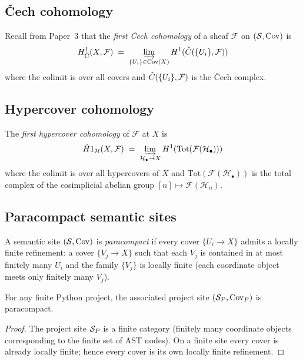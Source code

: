 \documentclass[11pt]{article}
\newcommand{\HC}{\mathcal{H}}              %
\newcommand{\HCech}{\hat{H}}              %
\begin{document}
\subsection{Čech cohomology}

Recall from Paper~3 that the \emph{first Čech cohomology} of a sheaf
$\mathcal{F}$ on $(\mathcal{S}, \mathrm{Cov})$ is
\[
  H^{1}_{\mathrm{\check{C}}}(X, \mathcal{F})
  \;=\;
  \varinjlim_{\{U_i\} \in \mathrm{Cov}(X)}
  H^{1}(\check{C}(\{U_i\}, \mathcal{F}))
\]
where the colimit is over all covers and $\check{C}(\{U_i\}, \mathcal{F})$
is the Čech complex.

\subsection{Hypercover cohomology}

\begin{definition}\label{def:hc-coh}
  The \emph{first hypercover cohomology} of $\mathcal{F}$ at $X$ is
  \[
    \HCech{1}_{\HC}(X, \mathcal{F})
    \;=\;
    \varinjlim_{\HC_\bullet \to X}
    H^1\!\left(\mathrm{Tot}(\mathcal{F}(\HC_\bullet))\right)
  \]
  where the colimit is over all hypercovers of $X$ and
  $\mathrm{Tot}(\mathcal{F}(\HC_\bullet))$ is the total complex of the
  cosimplicial abelian group $[n] \mapsto \mathcal{F}(\HC_n)$.
\end{definition}

\subsection{Paracompact semantic sites}

\begin{definition}\label{def:paracompact}
  A \JuGeo{} semantic site $(\mathcal{S}, \mathrm{Cov})$ is \emph{paracompact} if
  every cover $\{U_i \to X\}$ admits a locally finite refinement:
  a cover $\{V_j \to X\}$ such that each $V_j$ is contained in at
  most finitely many $U_i$ and the family $\{V_j\}$ is locally finite
  (each coordinate object meets only finitely many $V_j$).
\end{definition}

\begin{lemma}\label{lem:paracompact}
  For any finite Python project, the associated project site
  $(\mathcal{S}_P, \mathrm{Cov}_P)$ is paracompact.
\end{lemma}

\begin{proof}
  The project site $\mathcal{S}_P$ is a finite category (finitely many
  coordinate objects corresponding to the finite set of AST nodes).
  On a finite site every cover is already locally finite; hence every
  cover is its own locally finite refinement.
\end{proof}
\end{document}
